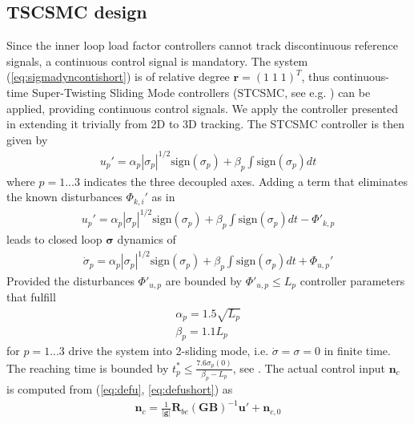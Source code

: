 \documentclass{ifacconf}
\providecommand{\mbf}[1]{\mathbf{#1}}
\newcommand{\idxAxis}{{\ensuremath{p}}}
\begin{document}
\subsection{TSCSMC design}
Since the inner loop load factor controllers cannot track discontinuous reference signals, a continuous control signal is mandatory.
The system (\ref{eq:sigmadyncontishort}) is of relative degree $\mbf{r} = (1 \; 1 \; 1)^T$, thus continuous-time Super-Twisting Sliding Mode controllers (STCSMC, see e.g. \cite{shtessel2014sliding}) can be applied, providing continuous control signals.
We apply the controller presented in \cite{galzi2006uav} extending it trivially from 2D to 3D tracking.
The STCSMC controller is then given by
\begin{align}
u_\idxAxis' = \alpha_\idxAxis |\sigma_\idxAxis|^{1/2}\mathrm{sign}(\sigma_\idxAxis) + \beta_\idxAxis \int \mathrm{sign}(\sigma_\idxAxis) dt
\end{align}
where $\idxAxis = 1...3$ indicates the three decoupled axes. Adding a term that eliminates the known disturbances ${\Phi}_{k,i}'$ as in \cite{galzi2006uav}
\begin{align}
u_\idxAxis' = \alpha_\idxAxis |\sigma_\idxAxis|^{1/2}\mathrm{sign}(\sigma_\idxAxis) + \beta_\idxAxis \int \mathrm{sign}(\sigma_\idxAxis) dt - {\Phi}'_{k,\idxAxis}
\end{align}
leads to closed loop $\mbf{\sigma}$ dynamics of
\begin{align}
\dot{\sigma}_\idxAxis = \alpha_\idxAxis |\sigma_\idxAxis|^{1/2}\mathrm{sign}(\sigma_\idxAxis) + \beta_\idxAxis \int \mathrm{sign}(\sigma_\idxAxis) dt + \Phi_{u,\idxAxis}'
\end{align}
Provided the disturbances $\Phi'_{u,\idxAxis}$ are bounded by $\Phi'_{u,\idxAxis} \leq L_\idxAxis$ controller parameters that fulfill
\begin{align}
\alpha_\idxAxis = 1.5 \sqrt{L_\idxAxis}
\label{eq:csmcgainconditionalpha}\\
\beta_\idxAxis = 1.1 L_\idxAxis
\label{eq:csmcgainconditionbeta}
\end{align}
for $\idxAxis=1...3$ drive the system into 2-sliding mode, i.e. $\dot{\sigma} = \sigma = 0$ in finite time. The reaching time is bounded by $t_\idxAxis^* \leq \frac{7.6 \sigma_\idxAxis(0)}{\beta_\idxAxis - L_\idxAxis}$, see \cite{galzi2006uav}.
The actual control input $\mbf{n}_c$ is computed from (\ref{eq:defu}, \ref{eq:defushort}) as
\begin{align}
\mbf{n}_c = \frac{1}{|\mbf{g}|} \mbf{R}_{be}(\mbf{GB})^{-1} \mbf{u}' + \mbf{n}_{c,0}
\end{align}
\end{document}
